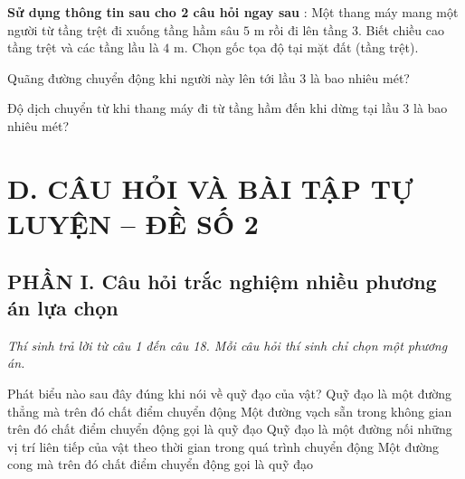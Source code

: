 \noindent\textbf{Sử dụng thông tin sau cho 2 câu hỏi ngay sau} : Một thang máy mang một người từ tầng trệt đi xuống tầng hầm sâu $5\text{ m}$ rồi đi lên tầng 3. Biết chiều cao tầng trệt và các tầng lầu là $4\text{ m}$. Chọn gốc tọa độ tại mặt đất (tầng trệt).

\begin{ex} Quãng đường chuyển động khi người này lên tới lầu 3 là bao nhiêu mét?

\end{ex}

\begin{ex} Độ dịch chuyển từ khi thang máy đi từ tầng hầm đến khi dừng tại lầu 3 là bao nhiêu mét?

\end{ex}


\section*{D. CÂU HỎI VÀ BÀI TẬP TỰ LUYỆN -- ĐỀ SỐ 2}

\setcounter{ex}{0}
\subsection*{PHẦN I. Câu hỏi trắc nghiệm nhiều phương án lựa chọn}
\textit{Thí sinh trả lời từ câu 1 đến câu 18. Mỗi câu hỏi thí sinh chỉ chọn một phương án.}

\begin{ex} Phát biểu nào sau đây đúng khi nói về quỹ đạo của vật?
\choice
{Quỹ đạo là một đường thẳng mà trên đó chất điểm chuyển động}
{Một đường vạch sẵn trong không gian trên đó chất điểm chuyển động gọi là quỹ đạo}
{\True Quỹ đạo là một đường nối những vị trí liên tiếp của vật theo thời gian trong quá trình chuyển động}
{Một đường cong mà trên đó chất điểm chuyển động gọi là quỹ đạo}
\end{ex}

